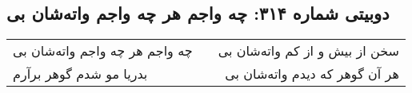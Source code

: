 \begin{center}
\section*{دوبیتی شماره ۳۱۴: چه واجم هر چه واجم واته‌شان بی}
\label{sec:314}
\begin{longtable}{l p{0.5cm} r}
چه واجم هر چه واجم واته‌شان بی
&&
سخن از بیش و از کم واته‌شان بی
\\
بدریا مو شدم گوهر برآرم
&&
هر آن گوهر که دیدم واته‌شان بی
\\
\end{longtable}
\end{center}
